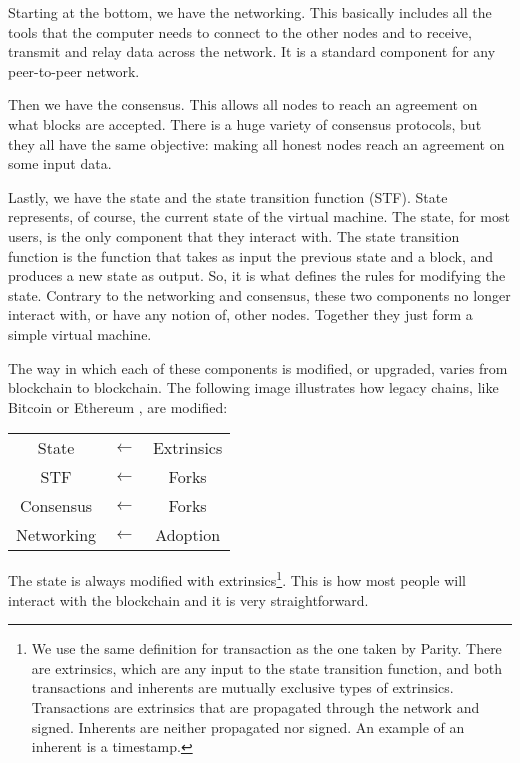 \documentclass[conference]{IEEEtran}
\begin{document}
Starting at the bottom, we have the networking. This basically includes all the tools that the computer needs to connect to the other nodes and to receive, transmit and relay data across the network. It is a standard component for any peer-to-peer network.

Then we have the consensus. This allows all nodes to reach an agreement on what blocks are accepted. There is a huge variety of consensus protocols, but they all have the same objective: making all honest nodes reach an agreement on some input data.

Lastly, we have the state and the state transition function (STF). State represents, of course, the current state of the virtual machine. The state, for most users, is the only component that they interact with. The state transition function is the function that takes as input the previous state and a block, and produces a new state as output. So, it is what defines the rules for modifying the state. Contrary to the networking and consensus, these two components no longer interact with, or have any notion of, other nodes. Together they just form a simple virtual machine.

The way in which each of these components is modified, or upgraded, varies from blockchain to blockchain. The following image illustrates how legacy chains, like Bitcoin \cite{nakamoto2008bitcoin} or Ethereum \cite{buterin2014next} \cite{wood2014ethereum}, are modified:

\begin{center}
	\begin{tabular}{c c c}
		State & $\leftarrow$ & Extrinsics\\
		\cline{1-1}
		STF & $\leftarrow$ & Forks\\
		\cline{1-1}
		Consensus & $\leftarrow$ & Forks\\
		\cline{1-1}
		Networking & $\leftarrow$ & Adoption
	\end{tabular}
\end{center}

The state is always modified with extrinsics\footnote{We use the same definition for transaction as the one taken by Parity. There are extrinsics, which are any input to the state transition function, and both transactions and inherents are mutually exclusive types of extrinsics. Transactions are extrinsics that are propagated through the network and signed. Inherents are neither propagated nor signed. An example of an inherent is a timestamp.}. This is how most people will interact with the blockchain and it is very straightforward.
\end{document}

